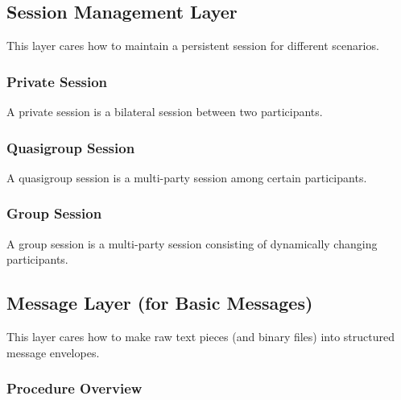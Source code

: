 
\subsection{Session Management Layer}

This layer cares how to maintain a persistent session for different scenarios.

\subsubsection{Private Session}

A private session is a bilateral session between two participants.

\subsubsection{Quasigroup Session}

A quasigroup session is a multi-party session among certain participants.

\subsubsection{Group Session}

A group session is a multi-party session consisting of dynamically changing participants.

\subsection{Message Layer (for Basic Messages)}

This layer cares how to make raw text pieces (and binary files) into structured message envelopes.

\subsubsection{Procedure Overview}

